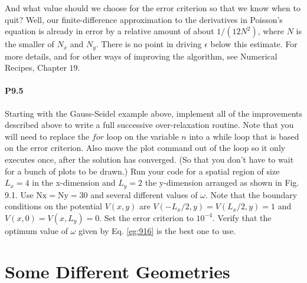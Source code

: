 \documentclass{book}
\theoremstyle{plain}
\theoremstyle{definition}
\numberwithin{exm}{chapter}
\theoremstyle{remark}
\theoremstyle{summary}
\theoremstyle{overview}
\begin{document}
And what value should we choose for the error criterion so that we know when to quit? Well, our finite-difference approximation to the derivatives in Poisson\rq s equation is already in error by a relative amount of about $1 /\left(12 N^{2}\right)$, where $N$ is the smaller of $N_{x}$ and $N_{y}$. There is no point in driving $\epsilon$ below this estimate. For more details, and for other ways of improving the algorithm, see Numerical Recipes, Chapter $19 .$

\paragraph*{P9.5}
Starting with the Gauss-Seidel example above, implement all of the improvements described above to write a full successive over-relaxation routine. Note that you will need to replace the $for$ loop on the variable $n$ into a while loop that is based on the error criterion. Also move the plot command out of the loop so it only executes once, after the solution has converged. (So that you don\rq t have to wait for a bunch of plots to be drawn.) Run your code for a spatial region of size $L_{x}=4$ in the x-dimension and $L_{y}=2$ the $\mathrm{y}$-dimension arranged as shown in Fig. 9.1. Use $\mathrm{Nx}=\mathrm{Ny}=30$ and several different values of $\omega$. Note that the boundary conditions on the potential $V(x, y)$ are $V\left(-L_{x} / 2, y\right)=V\left(L_{x} / 2, y\right)=1$ and $V(x, 0)=V\left(x, L_{y}\right)=0$. Set the error criterion to $10^{-4}$. Verify that the optimum value of $\omega$ given by Eq. \eqref{eg:916} is the best one to use.


\section*{Some Different Geometries}
\end{document}
